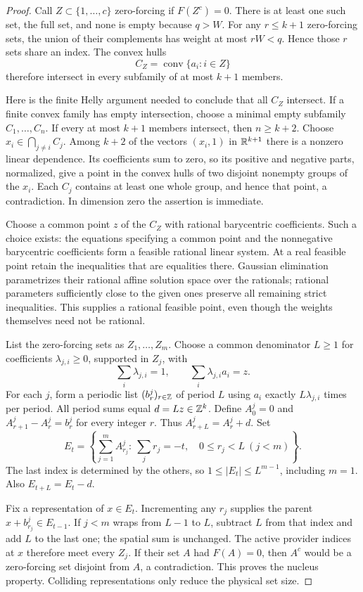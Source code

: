 \begin{proof}
Call $Z\subset\{1,\ldots,c\}$ zero-forcing if $F(Z^c)=0$. There is at least one such set, the full set, and none is empty because $q>W$. For any $r\le k+1$ zero-forcing sets, the union of their complements has weight at most $rW<q$. Hence those $r$ sets share an index. The convex hulls
\[
 C_Z=\operatorname{conv}\{a_i:i\in Z\}
\]
therefore intersect in every subfamily of at most $k+1$ members.

Here is the finite Helly argument needed to conclude that all $C_Z$ intersect. If a finite convex family has empty intersection, choose a minimal empty subfamily $C_1,\ldots,C_n$. If every at most $k+1$ members intersect, then $n\ge k+2$. Choose $x_i\in\bigcap_{j\ne i}C_j$. Among $k+2$ of the vectors $(x_i,1)$ in $\mathbb{R}^{k+1}$ there is a nonzero linear dependence. Its coefficients sum to zero, so its positive and negative parts, normalized, give a point in the convex hulls of two disjoint nonempty groups of the $x_i$. Each $C_j$ contains at least one whole group, and hence that point, a contradiction. In dimension zero the assertion is immediate.

Choose a common point $z$ of the $C_Z$ with rational barycentric coefficients. Such a choice exists: the equations specifying a common point and the nonnegative barycentric coefficients form a feasible rational linear system. At a real feasible point retain the inequalities that are equalities there. Gaussian elimination parametrizes their rational affine solution space over the rationals; rational parameters sufficiently close to the given ones preserve all remaining strict inequalities. This supplies a rational feasible point, even though the weights themselves need not be rational.

List the zero-forcing sets as $Z_1,\ldots,Z_m$. Choose a common denominator $L\ge1$ for coefficients $\lambda_{j,i}\ge0$, supported in $Z_j$, with
\[
 \sum_i\lambda_{j,i}=1,\qquad \sum_i\lambda_{j,i}a_i=z.
\]
For each $j$, form a periodic list $(b^j_r)_{r\in\mathbb{Z}}$ of period $L$ using $a_i$ exactly $L\lambda_{j,i}$ times per period. All period sums equal $d=Lz\in\mathbb{Z}^k$. Define $A^j_0=0$ and $A^j_{r+1}-A^j_r=b^j_r$ for every integer $r$. Thus $A^j_{r+L}=A^j_r+d$. Set
\[
 E_t=\left\{\sum_{j=1}^m A^j_{r_j}:\
       \sum_jr_j=-t,\quad 0\le r_j<L\ (j<m)\right\}.
\]
The last index is determined by the others, so $1\le|E_t|\le L^{m-1}$, including $m=1$. Also $E_{t+L}=E_t-d$.

Fix a representation of $x\in E_t$. Incrementing any $r_j$ supplies the parent $x+b^j_{r_j}\in E_{t-1}$. If $j<m$ wraps from $L-1$ to $L$, subtract $L$ from that index and add $L$ to the last one; the spatial sum is unchanged. The active provider indices at $x$ therefore meet every $Z_j$. If their set $A$ had $F(A)=0$, then $A^c$ would be a zero-forcing set disjoint from $A$, a contradiction. This proves the nucleus property. Colliding representations only reduce the physical set size.


\end{proof}
